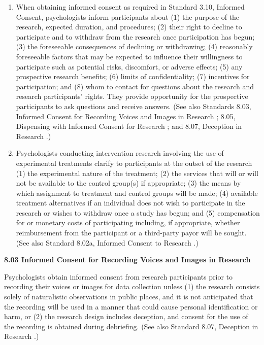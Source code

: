 \documentclass[
]{krantz}
\begin{document}
\begin{enumerate}
\def\labelenumi{(\alph{enumi})}
\item
  When obtaining informed consent as required in Standard 3.10, Informed Consent, psychologists inform participants about (1) the purpose of the research, expected duration, and procedures; (2) their right to decline to participate and to withdraw from the research once participation has begun; (3) the foreseeable consequences of declining or withdrawing; (4) reasonably foreseeable factors that may be expected to influence their willingness to participate such as potential risks, discomfort, or adverse effects; (5) any prospective research benefits; (6) limits of confidentiality; (7) incentives for participation; and (8) whom to contact for questions about the research and research participants' rights. They provide opportunity for the prospective participants to ask questions and receive answers. (See also Standards 8.03, Informed Consent for Recording Voices and Images in Research ; 8.05, Dispensing with Informed Consent for Research ; and 8.07, Deception in Research .)
\item
  Psychologists conducting intervention research involving the use of experimental treatments clarify to participants at the outset of the research (1) the experimental nature of the treatment; (2) the services that will or will not be available to the control group(s) if appropriate; (3) the means by which assignment to treatment and control groups will be made; (4) available treatment alternatives if an individual does not wish to participate in the research or wishes to withdraw once a study has begun; and (5) compensation for or monetary costs of participating including, if appropriate, whether reimbursement from the participant or a third-party payor will be sought. (See also Standard 8.02a, Informed Consent to Research .)
\end{enumerate}

\textbf{8.03 Informed Consent for Recording Voices and Images in Research}

Psychologists obtain informed consent from research participants prior to recording their voices or images for data collection unless (1) the research consists solely of naturalistic observations in public places, and it is not anticipated that the recording will be used in a manner that could cause personal identification or harm, or (2) the research design includes deception, and consent for the use of the recording is obtained during debriefing. (See also Standard 8.07, Deception in Research .)
\end{document}
